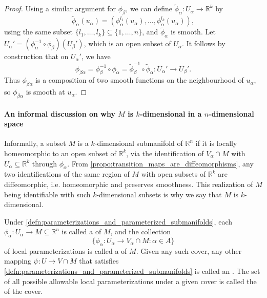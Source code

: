 \documentclass[notoc,notitlepage]{tufte-book}
\begin{document}
\begin{proof}
  Using a similar argument for $\phi_\beta$, we can define
  $\tilde{\phi}_{\alpha} : U_\alpha \to \mathbb{R}^k$ by
  \begin{equation*}
    \tilde{\phi}_{\alpha} (u_\alpha) = (\phi_\alpha^{l_1}(u_\alpha), \ldots,
    \phi_\alpha^{l_k}(u_\alpha)),
  \end{equation*}
  using the same subset $\{ l_1, \ldots, l_k \} \subseteq \{ 1, \ldots, n \}$,
  and $\tilde{\phi}_{\alpha}$ is smooth. Let $U_\alpha' = (\phi_\alpha^{-1}
  \circ \phi_\beta)(U_\beta')$, which is an open subset of $U_\alpha$. It
  follows by construction that on $U_\alpha'$, we have
  \begin{equation*}
    \phi_{\beta \alpha} = \phi_{\beta}^{-1} \circ \phi_{\alpha} =
      \tilde{\phi}_{\beta}^{-1} \circ \tilde{\phi}_{\alpha} : U_\alpha' \to
      U_\beta'. 
  \end{equation*}
  Thus $\phi_{\beta \alpha}$ is a composition of two smooth functions on the
  neighbourhood of $u_\alpha$, so $\phi_{\beta \alpha}$ is smooth at $u_\alpha$.
\end{proof}

\paragraph{An informal discussion on why $M$ is $k$-dimensional in a
$n$-dimensional space} Informally, a subset $M$ is a $k$-dimensional submanifold
of $\mathbb{R}^n$ if it is locally homeomorphic to an open subset of
$\mathbb{R}^k$, via the identification of $V_\alpha \cap M$ with $U_\alpha
\subseteq \mathbb{R}^k$ through $\phi_\alpha$. From
\cref{propo:transition_maps_are_diffeomorphisms}, any two identifications of the
same region of $M$ with open subsets of $\mathbb{R}^k$ are diffeomorphic, i.e.
homeomorphic and preserves smoothness. This realization of $M$ being
identifiable with such $k$-dimensional subsets is why we say that $M$ is
$k$-dimensional.

\begin{defn}\label{defn:local_parameterizations}
  Under \cref{defn:parameterizations_and_parameterized_submanifolds}, each
  $\phi_{\alpha} : U_\alpha \to M \subseteq \mathbb{R}^n$ is called a
   of $M$, and the collection
  \begin{equation*}
    \{ \phi_\alpha : U_\alpha \to V_\alpha \cap M : \alpha \in A \}
  \end{equation*}
  of local parameterizations is called a  of $M$. Given any such
  cover, any other mapping $\psi : U \to V \cap M$ that satisfies
  \cref{defn:parameterizations_and_parameterized_submanifolds} is called an
  . The set of all possible allowable
  local parameterizations under a given cover is called the  of the cover.
\end{defn}
\end{document}
